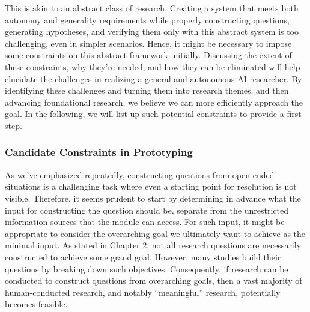 This is akin to an abstract class of research. Creating a system that meets both autonomy and generality requirements while properly constructing questions, generating hypotheses, and verifying them only with this abstract system is too challenging, even in simpler scenarios. Hence, it might be necessary to impose some constraints on this abstract framework initially. Discussing the extent of these constraints, why they're needed, and how they can be eliminated will help elucidate the challenges in realizing a general and  autonomous AI researcher. By identifying these challenges and turning them into research themes, and then advancing foundational research, we believe we can more efficiently approach the goal. In the following, we will list up such potential constraints to provide a first step.

\subsubsection{Candidate Constraints in Prototyping}

As we've emphasized repeatedly, constructing questions from open-ended situations is a challenging task where even a starting point for resolution is not visible. Therefore, it seems prudent to start by determining in advance what the input for constructing the question should be, separate from the unrestricted information sources that the module can access. For such input, it might be appropriate to consider the overarching goal we ultimately want to achieve as the minimal input. As stated in Chapter 2, not all research questions are necessarily constructed to achieve some grand goal. However, many studies build their questions by breaking down such objectives. Consequently, if research can be conducted to construct questions from overarching goals, then a vast majority of human-conducted research, and notably ``meaningful'' research, potentially becomes feasible.


